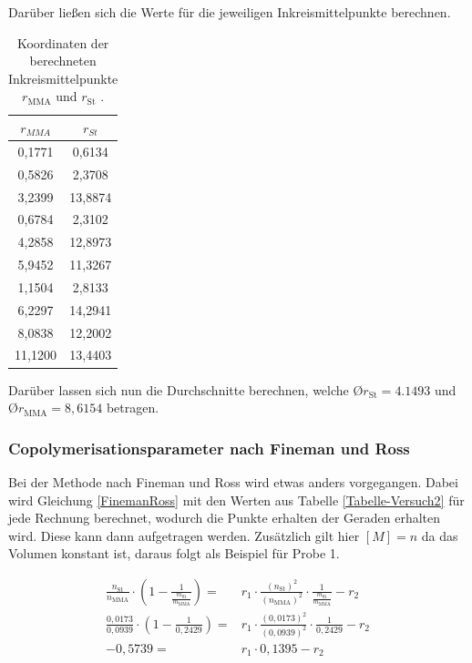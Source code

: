\documentclass[10pt,a4paper,ngerman]{scrartcl}
\begin{document}
		Darüber ließen sich die Werte für die jeweiligen Inkreismittelpunkte berechnen.

			\begin{table}[ht]
				\centering
				\caption{Koordinaten der berechneten Inkreismittelpunkte $r_\text{MMA}$ und $r_\text{St}$ .}
				\begin{tabular}{cc}
					\toprule
					\textbf{$r_{MMA}$} & \textbf{$r_{St}$} \\
					\midrule
					0,1771  & 0,6134  \\
					0,5826  & 2,3708  \\
					3,2399  & 13,8874 \\
					0,6784  & 2,3102  \\
					4,2858  & 12,8973 \\
					5,9452  & 11,3267 \\
					1,1504  & 2,8133  \\
					6,2297  & 14,2941 \\
					8,0838  & 12,2002 \\
					11,1200 & 13,4403 \\
					\bottomrule
				\end{tabular}
			\end{table}
		
		Darüber lassen sich nun die Durchschnitte berechnen, welche \O $r_\text{St} = 4.1493$ und \O $r_\text{MMA} = 8,6154$ betragen. 


	\subsubsection{Copolymerisationsparameter nach Fineman und Ross}

		Bei der Methode nach Fineman und Ross wird etwas anders vorgegangen.
		Dabei wird Gleichung \ref{FinemanRoss} mit den Werten aus Tabelle \ref{Tabelle-Versuch2} für jede Rechnung berechnet, wodurch die Punkte erhalten der Geraden erhalten wird. Diese kann dann aufgetragen werden.
		Zusätzlich gilt hier $[M] = n$ da das Volumen konstant ist, daraus folgt als Beispiel für Probe 1.

			\begin{eqnarray}
				\frac{n_\text{St}}{n_\text{MMA}} \cdot \left( 1- \frac{1}{\frac{{m_\text{St}}}{{m_\text{MMA}}}}\right) =& r_1 \cdot \frac{(n_\text{St})^2}{(n_\text{MMA})^2} \cdot \frac{1}{\frac{m_\text{St}}{m_\text{MMA}}} - r_2\\
				\frac{0,0173}{0,0939} \cdot \left( 1 - \frac{1}{0,2429} \right) =& r_1 \cdot \frac{(0,0173)^2}{(0,0939)^2} \cdot \frac{1}{0,2429} - r_2\\
				-0,5739 =& r_1 \cdot 0,1395 -r_2
			\end{eqnarray}
		
\end{document}
